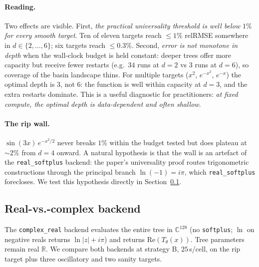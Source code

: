\documentclass[11pt]{article}
\begin{document}
\paragraph{Reading.}
Two effects are visible. First, \emph{the practical universality threshold
is well below $1\%$ for every smooth target}. Ten of eleven targets reach
$\leq 1\%$ relRMSE somewhere in $d \in \{2, \ldots, 6\}$; six targets reach
$\leq 0.3\%$. Second, \emph{error is not monotone in depth} when the wall-clock
budget is held constant: deeper trees offer more capacity but receive fewer
restarts (e.g.\ $34$ runs at $d{=}2$ vs $3$ runs at $d{=}6$), so coverage of
the basin landscape thins. For multiple targets ($x^2$, $e^{-x^2}$, $e^{-x}$)
the optimal depth is $3$, not $6$: the function is well within capacity at
$d{=}3$, and the extra restarts dominate. This is a useful diagnostic for
practitioners: \emph{at fixed compute, the optimal depth is data-dependent
and often shallow}.

\paragraph{The rip wall.}
$\sin(3x)\,e^{-x^2/2}$ never breaks $1\%$ within the budget tested but does
plateau at $\sim 2\%$ from $d{=}4$ onward. A natural hypothesis is that the
wall is an artefact of the \texttt{real\_softplus} backend: the paper's
universality proof routes trigonometric constructions through the principal
branch $\ln(-1) = i\pi$, which \texttt{real\_softplus} forecloses. We test
this hypothesis directly in Section~\ref{sec:complex}.

\subsection{Real-vs.-complex backend}
\label{sec:complex}

The \texttt{complex\_real} backend evaluates the entire tree in
$\mathbb{C}^{128}$ (no \texttt{softplus}; $\ln$ on negative reals returns
$\ln |z| + i\pi$) and returns $\mathrm{Re}(T_\theta(x))$. Tree parameters
remain real $\mathbb{R}$. We compare both backends at strategy B,
$25\,$s/cell, on the rip target plus three oscillatory and two sanity targets.
\end{document}
